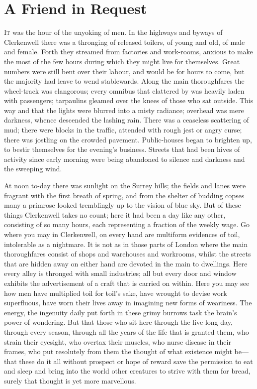 \chapter{A Friend in Request}

\textsc{It} was the hour of the unyoking of men. In the highways and
byways of Clerkenwell there was a thronging of released toilers, of
young and old, of male and female. Forth they streamed from factories
and work-rooms, anxious to make the most of the few hours during which
they might live for themselves. Great numbers were still bent over their
labour, and would be for hours to come, but the majority had leave to
wend stablewards. Along the main thoroughfares the wheel-track was
clangorous; every omnibus that clattered by was heavily laden with
passengers; tarpaulins gleamed over the knees of those who sat outside.
This way and that the lights were blurred into a misty radiance;
overhead was mere {}darkness, whence descended the lashing rain. There
was a ceaseless scattering of mud; there were blocks in the traffic,
attended with rough jest or angry curse; there was jostling on the
crowded pavement. Public-houses began to brighten up, to bestir
themselves for the evening's business. Streets that had been hives of
activity since early morning were being abandoned to silence and
darkness and the sweeping wind.

At noon to-day there was sunlight on the Surrey hills; the fields and
lanes were fragrant with the first breath of spring, and from the
shelter of budding copses many a primrose looked tremblingly up to the
vision of blue sky. But of these things Clerkenwell takes no count; here
it had been a day like any other, consisting of so many hours, each
representing a fraction of the weekly wage. Go where you may in
Clerkenwell, on every hand are multiform evidences of toil, intolerable
as a nightmare. It is not as in those parts of London where the main
thoroughfares consist of shops and warehouses and {}workrooms, whilst
the streets that are hidden away on either hand are devoted in the main
to dwellings. Here every alley is thronged with small industries; all
but every door and window exhibits the advertisement of a craft that is
carried on within. Here you may see how men have multiplied toil for
toil's sake, have wrought to devise work superfluous, have worn their
lives away in imagining new forms of weariness. The energy, the
ingenuity daily put forth in these grimy burrows task the brain's power
of wondering. But that those who sit here through the live-long day,
through every season, through all the years of the life that is granted
them, who strain their eyesight, who overtax their muscles, who nurse
disease in their frames, who put resolutely from them the thought of
what existence might be---that these do it all without prospect or hope
of reward save the permission to eat and sleep and bring into the world
other creatures to strive with them for bread, surely that thought is
yet more marvellous.

